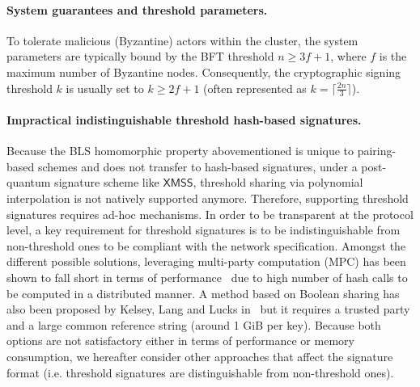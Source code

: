 \documentclass[11pt,a4paper]{article}
\newcommand{\XMSS}{\textsf{XMSS}\xspace}
\begin{document}
\paragraph{System guarantees and threshold parameters.}
To tolerate malicious (Byzantine) actors within the cluster, the system parameters are typically bound by the BFT threshold $n \geq 3f+1$, where $f$ is the maximum number of Byzantine nodes.
Consequently, the cryptographic signing threshold $k$ is usually set to $k \geq 2f+1$ (often represented as $k = \lceil \frac{2n}{3} \rceil$).


\paragraph{Impractical indistinguishable threshold hash-based signatures.}
Because the \textsf{BLS} homomorphic property abovementioned is unique to pairing-based schemes and does not transfer to hash-based signatures, under a post-quantum signature scheme like $\XMSS$, threshold sharing via polynomial interpolation is not natively supported anymore.
Therefore, supporting threshold signatures requires ad-hoc mechanisms.
In order to be transparent at the protocol level, a key requirement for threshold signatures is to be indistinguishable from non-threshold ones to be compliant with the network specification.
Amongst the different possible solutions, leveraging multi-party computation (MPC) has been shown to fall short in terms of performance~\cite{} due to high number of hash calls to be computed in a distributed manner.
A method based on Boolean sharing has also been proposed by Kelsey, Lang and Lucks in~\cite{10.62056/a6ksudy6b} but it requires a trusted party and a large common reference string (around 1 GiB per key).
Because both options are not satisfactory either in terms of performance or memory consumption, we hereafter consider other approaches that affect the signature format (i.e. threshold signatures are distinguishable from non-threshold ones). 
\end{document}
